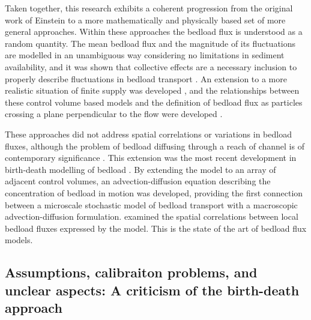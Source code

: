 Taken together, this research exhibits a coherent progression from the original work of Einstein to a more mathematically and physically based set of more general approaches. 
Within these approaches the bedload flux is understood as a random quantity. 
The mean bedload flux and the magnitude of its fluctuations are modelled in an unambiguous way \citep{Ancey2006, Ancey2008} considering no limitations in sediment availability, and it was shown that collective effects are a necessary inclusion to properly describe fluctuations in bedload transport \citep{Ancey2008}. 
An extension to a more realistic situation of finite supply was developed \citep{Turowski2009}, and the relationships between these control volume based models and the definition of bedload flux as particles crossing a plane perpendicular to the flow were developed \citep{Heyman2013, Ma2014b, Ballio2014}. 

These approaches did not address spatial correlations or variations in bedload fluxes, although the problem of bedload diffusing through a reach of channel is of contemporary significance \citep{Hassan2016}. 
This extension was the most recent development in birth-death modelling of bedload \citep{Ancey2014, Ancey2015}. 
By extending the \citet{Ancey2008} model to an array of adjacent control volumes, an advection-diffusion equation describing the concentration of bedload in motion was developed, providing the first connection between a microscale stochastic model of bedload transport with a macroscopic advection-diffusion formulation. 
\citet{Heyman2014} examined the spatial correlations between local bedload fluxes expressed by the \citet{Ancey2014} model. 
This is the state of the art of bedload flux models. 

\subsection{Assumptions, calibraiton problems, and unclear aspects: A criticism of the birth-death approach} 


